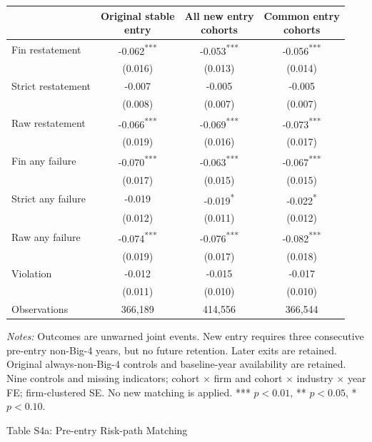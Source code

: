 \documentclass[10pt]{article}
\newcommand{\sym}[1]{\textsuperscript{#1}}
\begin{document}
\begin{tabular*}{\textwidth}{@{\extracolsep{\fill}}lccc@{}}
\toprule
 & \shortstack{Original stable\\entry} & \shortstack{All new entry\\cohorts} & \shortstack{Common entry\\cohorts} \\
\midrule
Fin restatement & -0.062\sym{***} & -0.053\sym{***} & -0.056\sym{***} \\
 & (0.016) & (0.013) & (0.014) \\
Strict restatement & -0.007 & -0.005 & -0.005 \\
 & (0.008) & (0.007) & (0.007) \\
Raw restatement & -0.066\sym{***} & -0.069\sym{***} & -0.073\sym{***} \\
 & (0.019) & (0.016) & (0.017) \\
Fin any failure & -0.070\sym{***} & -0.063\sym{***} & -0.067\sym{***} \\
 & (0.017) & (0.015) & (0.015) \\
Strict any failure & -0.019 & -0.019\sym{*} & -0.022\sym{*} \\
 & (0.012) & (0.011) & (0.012) \\
Raw any failure & -0.074\sym{***} & -0.076\sym{***} & -0.082\sym{***} \\
 & (0.019) & (0.017) & (0.018) \\
Violation & -0.012 & -0.015 & -0.017 \\
 & (0.011) & (0.010) & (0.010) \\
\midrule
Observations & 366,189 & 414,556 & 366,544 \\
\bottomrule\end{tabular*}
\medskip\par\fontsize{9}{11}\selectfont
\textit{Notes:} Outcomes are unwarned joint events. New entry requires three consecutive pre-entry non-Big-4 years, but no future retention. Later exits are retained. Original always-non-Big-4 controls and baseline-year availability are retained. Nine controls and missing indicators; cohort $\times$ firm and cohort $\times$ industry $\times$ year FE; firm-clustered SE. No new matching is applied. *** $p<0.01$, ** $p<0.05$, * $p<0.10$.
\par\fontsize{10}{12}\selectfont
\clearpage
\begin{center}\large Table S4a: Pre-entry Risk-path Matching\end{center}
\end{document}
